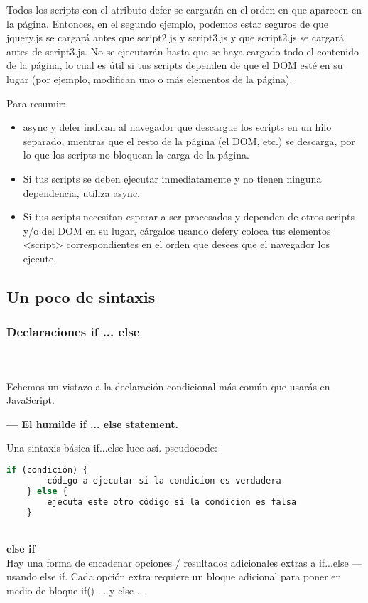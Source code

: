 \begin{enumerate}
Todos los scripts con el atributo defer se cargarán en el orden en que aparecen en la página. Entonces, en el segundo ejemplo, podemos estar seguros de que jquery.js se cargará antes que script2.js y script3.js y que script2.js se cargará antes de script3.js. No se ejecutarán hasta que se haya cargado todo el contenido de la página, lo cual es útil si tus scripts dependen de que el DOM esté en su lugar (por ejemplo, modifican uno o más elementos de la página).

Para resumir:

\begin{itemize}
	\item async y defer indican al navegador que descargue los scripts en un hilo separado, mientras que el resto de la página (el DOM, etc.) se descarga, por lo que los scripts no bloquean la carga de la página.
	\item Si tus scripts se deben ejecutar inmediatamente y no tienen ninguna dependencia, utiliza async.
	\item Si tus scripts necesitan esperar a ser procesados y dependen de otros scripts y/o del DOM en su lugar, cárgalos usando defery coloca tus elementos <script> correspondientes en el orden que desees que el navegador los ejecute.
\end{itemize}

\subsection{Un poco de sintaxis}

\subsubsection{Declaraciones if ... else }
\\\\
Echemos un vistazo a la declaración condicional más común que usarás en JavaScript.

\textbf{— El humilde if ... else statement.}

Una sintaxis básica if...else luce así. pseudocode:

\begin{lstlisting}[language=javascript]
	if (condición) {
		código a ejecutar si la condicion es verdadera
	} else {
		ejecuta este otro código si la condicion es falsa
	}
\end{lstlisting}
\\
\textbf{else if}
\\
Hay una forma de encadenar  opciones / resultados adicionales extras a if...else — usando else if. Cada opción extra requiere un bloque adicional para poner en medio de bloque if() { ... } y else { ... } 


\end{enumerate}
